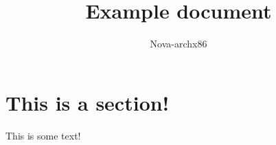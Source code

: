 \documentclass{article}
\title{Example document}
\author{Nova-archx86}
\begin{document}
\maketitle

\section{This is a section!}
This is some text!\\
\end{document}
